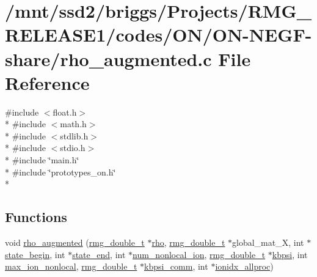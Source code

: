 \hypertarget{_o_n_2_o_n-_n_e_g_f-share_2rho__augmented_8c}{\section{/mnt/ssd2/briggs/\-Projects/\-R\-M\-G\-\_\-\-R\-E\-L\-E\-A\-S\-E1/codes/\-O\-N/\-O\-N-\/\-N\-E\-G\-F-\/share/rho\-\_\-augmented.c File Reference}
\label{_o_n_2_o_n-_n_e_g_f-share_2rho__augmented_8c}
}
{\ttfamily \#include $<$float.\-h$>$}\\*
{\ttfamily \#include $<$math.\-h$>$}\\*
{\ttfamily \#include $<$stdlib.\-h$>$}\\*
{\ttfamily \#include $<$stdio.\-h$>$}\\*
{\ttfamily \#include \char`\"{}main.\-h\char`\"{}}\\*
{\ttfamily \#include \char`\"{}prototypes\-\_\-on.\-h\char`\"{}}\\*
\subsection*{Functions}
\begin{DoxyCompactItemize}
\item 
void \hyperlink{_o_n_2_o_n-_n_e_g_f-share_2rho__augmented_8c_a5af290ceb829a552bb067b8a100e3f07}{rho\-\_\-augmented} (\hyperlink{rmgtypes_8h_aaa16921c14f121c56eaa42390a340db8}{rmg\-\_\-double\-\_\-t} $\ast$\hyperlink{md_8h_a52b35cee8a5db846ce98f4904e1c8b13}{rho}, \hyperlink{rmgtypes_8h_aaa16921c14f121c56eaa42390a340db8}{rmg\-\_\-double\-\_\-t} $\ast$global\-\_\-mat\-\_\-\-X, int $\ast$\hyperlink{overlap_8h_ac1e3596fc6bf65483bbbd9494b002e17}{state\-\_\-begin}, int $\ast$\hyperlink{overlap_8h_addfc8c8c13b8a2ccb81fb7957b1474b2}{state\-\_\-end}, int $\ast$\hyperlink{overlap_8h_acc14911e05b3f821815a5c666954414c}{num\-\_\-nonlocal\-\_\-ion}, \hyperlink{rmgtypes_8h_aaa16921c14f121c56eaa42390a340db8}{rmg\-\_\-double\-\_\-t} $\ast$\hyperlink{overlap_8h_aa5c5ccb14e2d6e1303536c0d5b8f10e6}{kbpsi}, int \hyperlink{overlap_8h_abcaca526c7f03c5fe2eebcc6076cdd19}{max\-\_\-ion\-\_\-nonlocal}, \hyperlink{rmgtypes_8h_aaa16921c14f121c56eaa42390a340db8}{rmg\-\_\-double\-\_\-t} $\ast$\hyperlink{overlap_8h_aecee237a23b1e317a41c209a9b9ffa1f}{kbpsi\-\_\-comm}, int $\ast$\hyperlink{overlap_8h_ae5e305c1dbcd0c30c5d5ce69e733150a}{ionidx\-\_\-allproc})
\end{DoxyCompactItemize}


